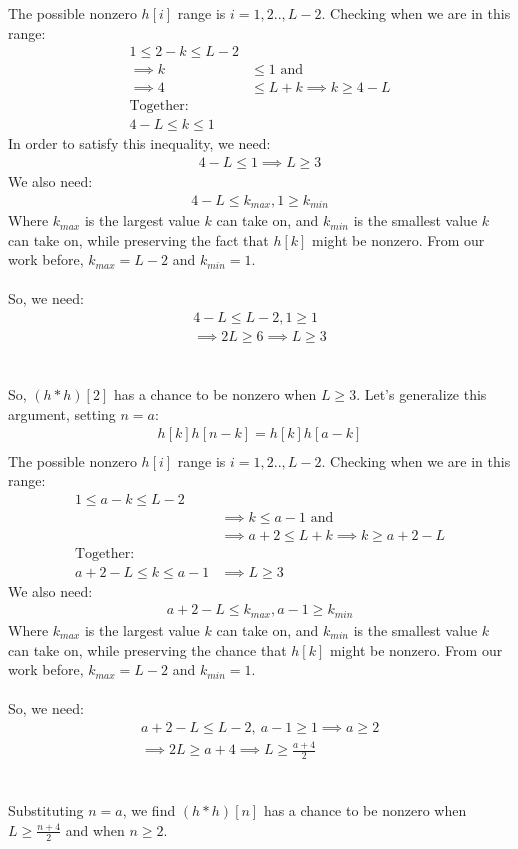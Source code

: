\documentclass[a4paper]{article}
\begin{document}
The possible nonzero $h[i]$ range is $i = 1,2..,L-2$. Checking when we are in this range:
\begin{align*}
1 \leq 2-k \leq L -2 \\
\implies k &\leq 1 \text{ and}\\
\implies 4 &\leq L + k \implies k \geq 4 - L \\
\text{Together: } \\
4 - L \leq k \leq 1
\end{align*}
In order to satisfy this inequality, we need:
\begin{align*}
4 - L \leq 1 \implies L \geq 3
\end{align*}
We also need:
\begin{align*}
4 - L  \leq k_{max}, 1  \geq k_{min}
\end{align*}
Where $k_{max}$ is the largest value $k$ can take on, and $k_{min}$ is the smallest value $k$ can take on, while preserving the fact that $h[k]$ might be nonzero. From our work before, $k_{max} = L - 2$ and $k_{min} = 1$.
\\\\
So, we need:
\begin{align*}
4 - L \leq L -2, 1 \geq 1 \\
\implies 2L \geq 6 \implies L \geq 3
\end{align*}
\\\\
So, $(h*h)[2]$ has a chance to be nonzero when $L \geq 3$.
\clearpage
Let's generalize this argument, setting $n = a$:
\begin{align*}
h[k]h[n-k] = h[k]h[a-k] \\
\end{align*}
The possible nonzero $h[i]$ range is $i = 1,2..,L-2$. Checking when we are in this range:
\begin{align*}
1 \leq a-k \leq L -2 \\
&\implies k \leq a - 1 \text{ and}\\
&\implies a + 2 \leq L + k \implies k \geq a + 2 - L \\
\text{Together: } \\
a + 2 - L \leq k \leq a - 1
&\implies L \geq 3
\end{align*}
We also need:
\begin{align*}
a + 2 - L  \leq k_{max}, a - 1  \geq k_{min}
\end{align*}
Where $k_{max}$ is the largest value $k$ can take on, and $k_{min}$ is the smallest value $k$ can take on, while preserving the chance that $h[k]$ might be nonzero. From our work before, $k_{max} = L - 2$ and $k_{min} = 1$.
\\\\
So, we need:
\begin{align*}
a +2 - L \leq L -2,~a-1 \geq 1 \implies a \geq 2 \\
\implies 2L \geq a + 4 \implies L \geq \frac{a+4}{2}
\end{align*}
\\\\
Substituting $n = a$, we find $(h*h)[n]$ has a chance to be nonzero when $L \geq \frac{n+4}{2}$ and when $n \geq 2$.
\\\\
\end{document}
